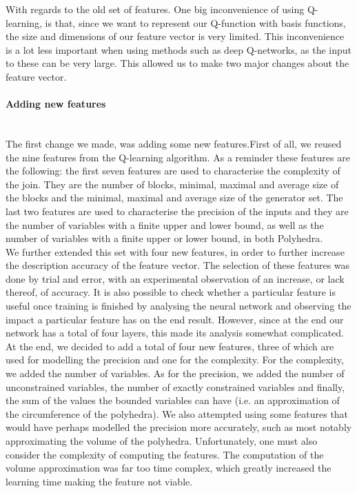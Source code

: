 With regards to the old set of features. One big inconvenience of using Q-learning, is that, since we want to represent our Q-function with basis functions, the size and dimensions of our feature vector is very limited. This inconvenience is a lot less important when using methods such as deep Q-networks, as the input to these can be very large. This allowed us to make two major changes about the feature vector. 
\paragraph{Adding new features}\mbox{}\\
The first change we made, was adding some new features.First of all, we reused the nine features from the Q-learning algorithm. As a reminder these features are the following: the first seven features are used to characterise the complexity of the join. They are the number of blocks, minimal, maximal and average size of the blocks and the minimal, maximal and average size of the generator set. The last two features are used to characterise the precision of the inputs and they are the number of variables with a finite upper and lower bound, as well as the number of variables with a finite upper or lower bound, in both Polyhedra.\\
We further extended this set with four new features, in order to further increase the description accuracy of the feature vector. The selection of these features was done by trial and error, with an experimental observation of an increase, or lack thereof, of accuracy. It is also possible to check whether a particular feature is useful once training is finished by analysing the neural network and observing the impact a particular feature has on the end result. However, since at the end our network has a total of four layers, this made its analysis somewhat complicated.\\
At the end, we decided to add a total of four new features, three of which are used for modelling the precision and one for the complexity. For the complexity, we added the number of variables. As for the precision, we added the number of unconstrained variables, the number of exactly constrained variables and finally, the sum of the values the bounded variables can have (i.e. an approximation of the circumference of the polyhedra). We also attempted using some features that would have perhaps modelled the precision more accurately, such as most notably approximating the volume of the polyhedra. Unfortunately, one must also consider the complexity of computing the features. The computation of the volume approximation was far too time complex, which greatly increased the learning time making the feature not viable.\\
